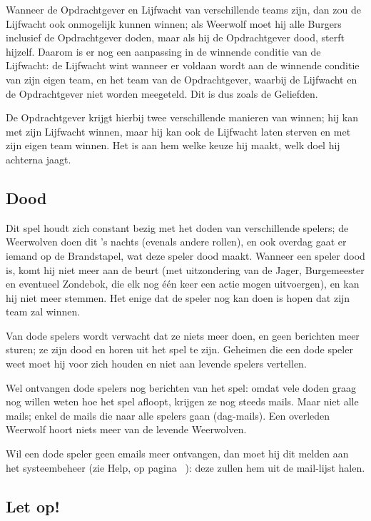 \documentclass[12pt]{article}
\begin{document}
    Wanneer de Opdrachtgever en Lijfwacht van verschillende teams zijn, dan zou de Lijfwacht ook onmogelijk kunnen winnen; als Weerwolf moet hij alle Burgers inclusief de Opdrachtgever doden, maar als hij de Opdrachtgever dood, sterft hijzelf. Daarom is er nog een aanpassing in de winnende conditie van de Lijfwacht: de Lijfwacht wint wanneer er voldaan wordt aan de winnende conditie van zijn eigen team, en het team van de Opdrachtgever, waarbij de Lijfwacht en de Opdrachtgever niet worden meegeteld. Dit is dus zoals de Geliefden.
    
    De Opdrachtgever krijgt hierbij twee verschillende manieren van winnen; hij kan met zijn Lijfwacht winnen, maar hij kan ook de Lijfwacht laten sterven en met zijn eigen team winnen. Het is aan hem welke keuze hij maakt, welk doel hij achterna jaagt.
    
  \subsection{Dood}
  
    Dit spel houdt zich constant bezig met het doden van verschillende spelers; de Weerwolven doen dit 's nachts (evenals andere rollen), en ook overdag gaat er iemand op de Brandstapel, wat deze speler dood maakt. Wanneer een speler dood is, komt hij niet meer aan de beurt (met uitzondering van de Jager, Burgemeester en eventueel Zondebok, die elk nog \'e\'en keer een actie mogen uitvoergen), en kan hij niet meer stemmen. Het enige dat de speler nog kan doen is hopen dat zijn team zal winnen.
    
    Van dode spelers wordt verwacht dat ze niets meer doen, en geen berichten meer sturen; ze zijn dood en horen uit het spel te zijn. Geheimen die een dode speler weet moet hij voor zich houden en niet aan levende spelers vertellen. 
    
    Wel ontvangen dode spelers nog berichten van het spel: omdat vele doden graag nog willen weten hoe het spel afloopt, krijgen ze nog steeds mails. Maar niet alle mails; enkel de mails die naar alle spelers gaan (dag-mails). Een overleden Weerwolf hoort niets meer van de levende Weerwolven.
    
    Wil een dode speler geen emails meer ontvangen, dan moet hij dit melden aan het systeembeheer (zie Help, op pagina~\pageref{subsec:help} ): deze zullen hem uit de mail-lijst halen.
    
  \subsection{Let op!}
  
\end{document}
